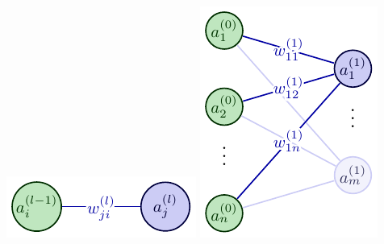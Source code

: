 \begin{minipage}{0.4\textwidth}
\includegraphics[width=\textwidth]{tikz/b.pdf}
\vspace{0.8cm}
\includegraphics[width=\textwidth]{tikz/a.pdf}
\end{minipage}
\begin{minipage}{0.05\textwidth}
\
\end{minipage}
